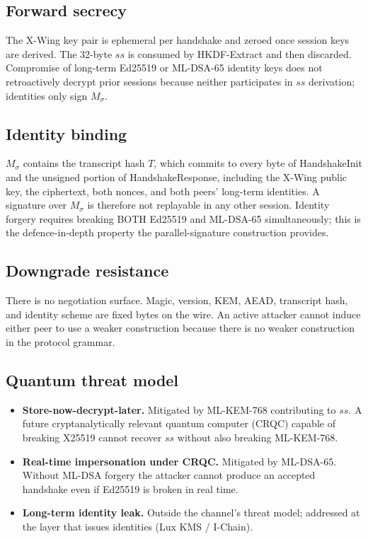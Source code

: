 \documentclass[11pt,a4paper]{article}
\begin{document}
\subsection{Forward secrecy}

The X-Wing key pair is ephemeral per handshake and zeroed once
session keys are derived. The 32-byte $ss$ is consumed by HKDF-Extract
and then discarded. Compromise of long-term Ed25519 or ML-DSA-65
identity keys does not retroactively decrypt prior sessions because
neither participates in $ss$ derivation; identities only sign
$M_{\sigma}$.

\subsection{Identity binding}

$M_{\sigma}$ contains the transcript hash $T$, which commits to every
byte of HandshakeInit and the unsigned portion of HandshakeResponse,
including the X-Wing public key, the ciphertext, both nonces, and both
peers' long-term identities. A signature over $M_{\sigma}$ is therefore
not replayable in any other session. Identity forgery requires breaking
BOTH Ed25519 and ML-DSA-65 simultaneously; this is the defence-in-depth
property the parallel-signature construction provides.

\subsection{Downgrade resistance}

There is no negotiation surface. Magic, version, KEM, AEAD, transcript
hash, and identity scheme are fixed bytes on the wire. An active
attacker cannot induce either peer to use a weaker construction
because there is no weaker construction in the protocol grammar.

\subsection{Quantum threat model}

\begin{itemize}[leftmargin=*]
  \item \textbf{Store-now-decrypt-later.} Mitigated by ML-KEM-768
        contributing to $ss$. A future cryptanalytically relevant
        quantum computer (CRQC) capable of breaking X25519 cannot
        recover $ss$ without also breaking ML-KEM-768.
  \item \textbf{Real-time impersonation under CRQC.} Mitigated by
        ML-DSA-65. Without ML-DSA forgery the attacker cannot produce
        an accepted handshake even if Ed25519 is broken in real time.
  \item \textbf{Long-term identity leak.} Outside the channel's
        threat model; addressed at the layer that issues identities
        (Lux KMS / I-Chain).
\end{itemize}
\end{document}
